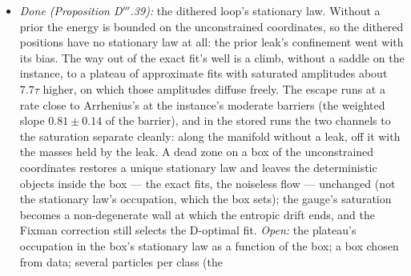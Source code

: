 \begin{enumerate}[label=\arabic*.,leftmargin=*]
\begin{itemize}
      time, for a noise white on the orbit's resolution and of any temporal spectrum, the masses neither diffuse nor
      drift along the manifold at leading order (other noise structures over the nodes leave an $O(\gamma)$ residual).
      Only an update that draws the noise afresh selects --- label-noise SGD's flat-minimum bias, on the replicator's
      masses a strictly convex potential whose minimiser is interior, its form depending on the coordinates of the
      update ---, and for correlated draws the increment's second moment selects, not the noise's variance: each pair of
      normal modes is weighted by a linear-response factor, the potential passing from the trace (Damian--Ma--Lee's
      finite-step form for fresh draws) to $(1/\tau_c)\log\det(I + \tau_c\nabla^2J)$ as a Markov noise slows ---
      concave for every colour ---; a slow Markov measurement noise selects as a dither of the flow's own mobility does,
      and at a finite replicator rate the coloured selection is multistable: three stable targets, each with one class's
      mass large. \emph{Open:} the order-$v^2$ motion; the real loop's sampled-data implementation; which target a given
      start reaches, beyond the instance.
    \item \emph{Done (Proposition D$'''$.39):} the dithered loop's stationary law. Without a prior the energy is
      bounded on the unconstrained coordinates, so the dithered positions have no stationary law at all: the prior
      leak's confinement went with its bias. The way out of the exact fit's well is a climb, without a saddle on the
      instance, to a plateau of approximate fits with saturated amplitudes about $7.7\tau$ higher, on which those
      amplitudes diffuse freely. The escape runs at a rate close to Arrhenius's at the instance's moderate barriers
      (the weighted slope $0.81\pm0.14$ of the barrier), and in the stored runs the two channels to the saturation
      separate cleanly: along the manifold without a leak, off it with the masses held by the leak. A dead zone on a
      box of the unconstrained coordinates restores a unique stationary law and leaves the deterministic objects inside
      the box --- the exact fits, the noiseless flow --- unchanged (not the stationary law's occupation, which the box
      sets); the gauge's saturation becomes a non-degenerate wall at which the entropic drift ends, and the Fixman correction still selects the D-optimal fit. \emph{Open:} the plateau's occupation in
      the box's stationary law as a function of the box; a box chosen from data; several particles per class (the

\end{itemize}
\end{enumerate}
